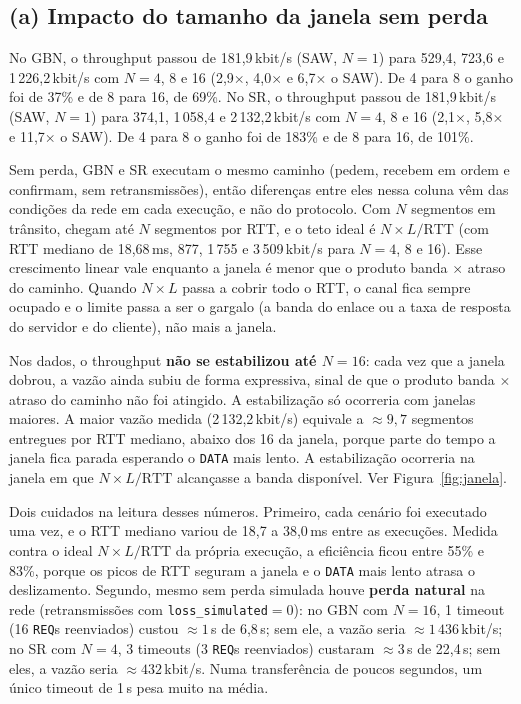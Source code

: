 \subsection*{(a) Impacto do tamanho da janela sem perda}

No GBN, o throughput passou de 181,9\,kbit/s (SAW, $N=1$) para 529,4, 723,6 e 1\,226,2\,kbit/s com $N = 4$, 8 e 16 (2,9$\times$, 4,0$\times$ e 6,7$\times$ o SAW). De 4 para 8 o ganho foi de 37\% e de 8 para 16, de 69\%. No SR, o throughput passou de 181,9\,kbit/s (SAW, $N=1$) para 374,1, 1\,058,4 e 2\,132,2\,kbit/s com $N = 4$, 8 e 16 (2,1$\times$, 5,8$\times$ e 11,7$\times$ o SAW). De 4 para 8 o ganho foi de 183\% e de 8 para 16, de 101\%.

\par Sem perda, GBN e SR executam o mesmo caminho (pedem, recebem em ordem e confirmam, sem retransmissões), então diferenças entre eles nessa coluna vêm das condições da rede em cada execução, e não do protocolo. Com $N$ segmentos em trânsito, chegam até $N$ segmentos por RTT, e o teto ideal é $N \times L/\mathrm{RTT}$ (com RTT mediano de 18,68\,ms, 877, 1\,755 e 3\,509\,kbit/s para $N = 4$, 8 e 16). Esse crescimento linear vale enquanto a janela é menor que o produto banda $\times$ atraso do caminho. Quando $N \times L$ passa a cobrir todo o RTT, o canal fica sempre ocupado e o limite passa a ser o gargalo (a banda do enlace ou a taxa de resposta do servidor e do cliente), não mais a janela.

\par Nos dados, o throughput \textbf{não se estabilizou até $N = 16$}: cada vez que a janela dobrou, a vazão ainda subiu de forma expressiva, sinal de que o produto banda $\times$ atraso do caminho não foi atingido. A estabilização só ocorreria com janelas maiores. A maior vazão medida (2\,132,2\,kbit/s) equivale a $\approx 9,7$ segmentos entregues por RTT mediano, abaixo dos 16 da janela, porque parte do tempo a janela fica parada esperando o \texttt{DATA} mais lento. A estabilização ocorreria na janela em que $N \times L/\mathrm{RTT}$ alcançasse a banda disponível. Ver Figura~\ref{fig:janela}.

\par Dois cuidados na leitura desses números. Primeiro, cada cenário foi executado uma vez, e o RTT mediano variou de 18,7 a 38,0\,ms entre as execuções. Medida contra o ideal $N \times L/\mathrm{RTT}$ da própria execução, a eficiência ficou entre 55\% e 83\%, porque os picos de RTT seguram a janela e o \texttt{DATA} mais lento atrasa o deslizamento. Segundo, mesmo sem perda simulada houve \textbf{perda natural} na rede (retransmissões com \texttt{loss\_simulated}$=0$): no GBN com $N=16$, 1 timeout (16 \texttt{REQ}s reenviados) custou $\approx 1$\,s de 6,8\,s; sem ele, a vazão seria $\approx 1\,436$\,kbit/s; no SR com $N=4$, 3 timeouts (3 \texttt{REQ}s reenviados) custaram $\approx 3$\,s de 22,4\,s; sem eles, a vazão seria $\approx 432$\,kbit/s. Numa transferência de poucos segundos, um único timeout de 1\,s pesa muito na média.

